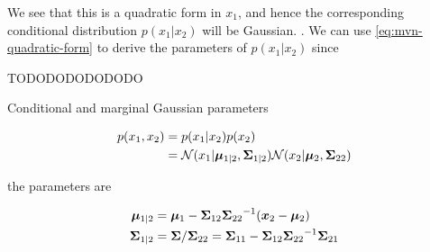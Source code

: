
We see that this is a quadratic form in $x_1$, and hence the corresponding conditional distribution $p(x_1 | x_2)$ will be Gaussian. . We can use \eqref{eq:mvn-quadratic-form} to derive the parameters of $p(x_1 | x_2)$ since


\citep{murphy2012machine}






TODODODODODODO


\begin{thm} Conditional and marginal Gaussian parameters \citep{murphy2012machine} 

\begin{align}
p(x_1, x_2) &= p(x_1 | x_2) p(x_2) \\
&= {\mathcal{N}}(x_1 | {\bm{\mu}}_{1|2}, {{\bm{\Sigma}}_{1|2}}) {\mathcal{N}}(x_2 | {\bm{\mu}}_2, {{\bm{\Sigma}}_{22}})
\end{align}

the parameters are 

\begin{align}
{\bm{\mu}}_{1|2} &= {\bm{\mu}}_1 - {{\bm{\Sigma}}_{12}} {{\bm{\Sigma}}_{22}}^{-1} ({\bm{x}}_2 - {\bm{\mu}}_2) \\
{{\bm{\Sigma}}_{1|2}} &= {\bm{\Sigma}} / {{\bm{\Sigma}}_{22}} = {{\bm{\Sigma}}_{11}} - {{\bm{\Sigma}}_{12}} {{\bm{\Sigma}}_{22}}^{-1} {{\bm{\Sigma}}_{21}}
\end{align}
\end{thm}

